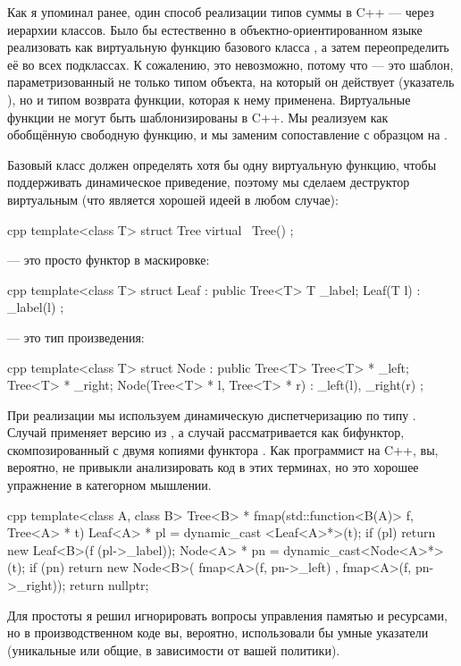 Как я упоминал ранее, один способ реализации типов суммы в C++ ---
через иерархии классов. Было бы естественно в объектно-ориентированном
языке реализовать  как виртуальную функцию базового
класса , а затем переопределить её во всех подклассах.
К сожалению, это невозможно, потому что  --- это шаблон,
параметризованный не только типом объекта, на который он действует (указатель
), но и типом возврата функции,
которая к нему применена. Виртуальные функции не могут быть шаблонизированы в
C++. Мы реализуем  как обобщённую свободную функцию, и мы
заменим сопоставление с образцом на .

Базовый класс должен определять хотя бы одну виртуальную функцию, чтобы
поддерживать динамическое приведение, поэтому мы сделаем деструктор виртуальным (что является
хорошей идеей в любом случае):

\begin{snip}{cpp}
template<class T>
struct Tree {
    virtual ~Tree() {}
};
\end{snip}
 --- это просто функтор  в маскировке:

\begin{snip}{cpp}
template<class T>
struct Leaf : public Tree<T> {
    T _label;
    Leaf(T l) : _label(l) {}
};
\end{snip}
 --- это тип произведения:

\begin{snip}{cpp}
template<class T>
struct Node : public Tree<T> {
    Tree<T> * _left;
    Tree<T> * _right;
    Node(Tree<T> * l, Tree<T> * r) : _left(l), _right(r) {}
};
\end{snip}
При реализации  мы используем динамическую диспетчеризацию
по типу . Случай  применяет версию
 из , а случай 
рассматривается как бифунктор, скомпозированный с двумя копиями
функтора . Как программист на C++, вы, вероятно, не привыкли
анализировать код в этих терминах, но это хорошее упражнение в категорном
мышлении.

\begin{snip}{cpp}
template<class A, class B>
Tree<B> * fmap(std::function<B(A)> f, Tree<A> * t) {
    Leaf<A> * pl = dynamic_cast <Leaf<A>*>(t);
    if (pl)
        return new Leaf<B>(f (pl->_label));
    Node<A> * pn = dynamic_cast<Node<A>*>(t);
    if (pn)
        return new Node<B>( fmap<A>(f, pn->_left)
                          , fmap<A>(f, pn->_right));
    return nullptr;
}
\end{snip}
Для простоты я решил игнорировать вопросы управления памятью и ресурсами,
но в производственном коде вы, вероятно, использовали бы умные указатели
(уникальные или общие, в зависимости от вашей политики).

